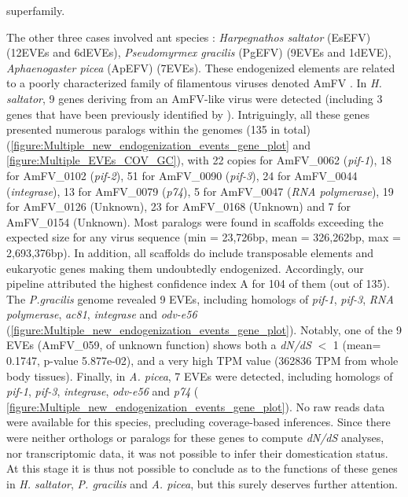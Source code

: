  superfamily.

The other three cases involved ant species : \textit{Harpegnathos saltator} (EsEFV) 
(12EVEs and 6dEVEs), \textit{Pseudomyrmex gracilis} (PgEFV) (9EVEs and 1dEVE), \textit{Aphaenogaster picea} (ApEFV) (7EVEs). These endogenized elements are related to a poorly characterized family of filamentous viruses denoted AmFV \citep{hartmann_dynamics_2015,yang_genomics_2022}. In \textit{H. saltator}, 9 genes deriving from an AmFV-like virus were detected (including 3 genes that have been previously identified by \citep{flynn_assessing_2019}). Intriguingly, all these genes presented  numerous paralogs within the genomes (135 in total) (\figurename{\ref{figure:Multiple_new_endogenization_events_gene_plot}} and \figurename{\ref{figure:Multiple_EVEs_COV_GC}}), with 22 copies for AmFV\_0062 (\textit{pif-1}), 18 for AmFV\_0102 (\textit{pif-2}), 51 for AmFV\_0090 (\textit{pif-3}), 24 for AmFV\_0044 (\textit{integrase}), 13 for AmFV\_0079 (\textit{p74}), 5 for AmFV\_0047 (\textit{RNA polymerase}), 19 for AmFV\_0126 (Unknown), 23 for AmFV\_0168 (Unknown) and  7 for AmFV\_0154 (Unknown). Most paralogs were found in scaffolds exceeding the expected size for any virus sequence (min = 23,726bp, mean = 326,262bp, max = 2,693,376bp). In addition, all scaffolds do include transposable elements and eukaryotic genes making them undoubtedly endogenized. Accordingly, our pipeline attributed the highest confidence index A for 104 of them (out of 135). The \textit{P.gracilis} genome revealed 9 EVEs, including homologs of \textit{pif-1}, \textit{pif-3}, \textit{RNA polymerase}, \textit{ac81}, \textit{integrase} and \textit{odv-e56} (\figurename{\ref{figure:Multiple_new_endogenization_events_gene_plot}}). Notably, one of the 9 EVEs (AmFV\_059, of unknown function) shows both a \textit{dN/dS} $<$ 1 (mean= 0.1747, p-value 5.877e-02), and a very high TPM value (362836 TPM from whole body tissues). Finally, in \textit{A. picea}, 7 EVEs were detected, including homologs of \textit{pif-1}, \textit{pif-3}, \textit{integrase}, \textit{odv-e56} and \textit{p74} (\figurename{ \ref{figure:Multiple_new_endogenization_events_gene_plot}}). No raw reads data were available for this species, precluding coverage-based inferences. Since there were neither orthologs or paralogs for these genes to compute \textit{dN/dS} analyses, nor transcriptomic data, it was not possible to infer their domestication status. At this stage it is thus not possible to conclude as to the functions of these genes in \textit{H. saltator}, \textit{P. gracilis} and \textit{A. picea}, but this surely deserves further attention.

